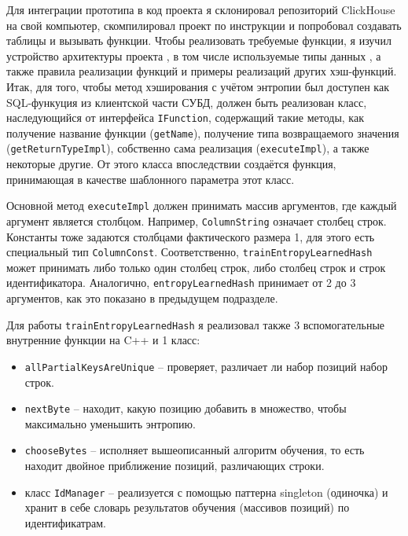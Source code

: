 \documentclass[a4paper,12pt]{extarticle}
\begin{document}
\begin{sloppypar}
Для интеграции прототипа в код проекта я склонировал репозиторий ClickHouse на свой компьютер, скомпилировал проект по инструкции \cite{clickhouse_build_instruction} и попробовал создавать таблицы и вызывать функции. Чтобы реализовать требуемые функции, я изучил устройство архитектуры проекта \cite{clickhouse_architecture}, в том числе используемые типы данных \cite{clickhouse_data_types}, а также правила реализации функций \cite{clickhouse_reqular_functions} \cite{clickhouse_aggregate_functions} и примеры реализаций других хэш-функций. 
Итак, для того, чтобы метод хэширования с учётом энтропии был доступен как SQL-функуция из клиентской части СУБД, должен быть реализован класс, наследующийся от интерфейса \texttt{IFunction}, содержащий такие методы, как получение название функции (\texttt{getName}), получение типа возвращаемого значения (\texttt{getReturnTypeImpl}), собственно сама реализация (\texttt{executeImpl}), а также некоторые другие. От этого класса впоследствии создаётся функция, принимающая в качестве шаблонного параметра этот класс.

Основной метод \texttt{executeImpl} должен принимать массив аргументов, где каждый аргумент является столбцом. Например, \texttt{ColumnString} означает столбец строк. Константы тоже задаются столбцами фактического размера 1, для этого есть специальный тип \texttt{ColumnConst}. Соответственно, \texttt{trainEntropyLearnedHash} может принимать либо только один столбец строк, либо столбец строк и строк идентификатора. Аналогично, \texttt{entropyLearnedHash} принимает от 2 до 3 аргументов, как это показано в предыдущем подразделе.

Для работы \texttt{trainEntropyLearnedHash} я реализовал также 3 вспомогательные внутренние функции на C++ и 1 класс: 
\begin{itemize}
	\item \texttt{allPartialKeysAreUnique} -- проверяет, различает ли набор позиций набор строк.
	\item \texttt{nextByte} -- находит, какую позицию добавить в множество, чтобы максимально уменьшить энтропию.
	\item \texttt{chooseBytes} -- исполняет вышеописанный алгоритм обучения, то есть находит двойное приближение позиций, различающих строки.
	\item класс \texttt{IdManager} -- реализуется с помощью паттерна singleton (одиночка) и хранит в себе словарь результатов обучения (массивов позиций) по идентификатрам.
\end{itemize}


\end{sloppypar}
\end{document}
